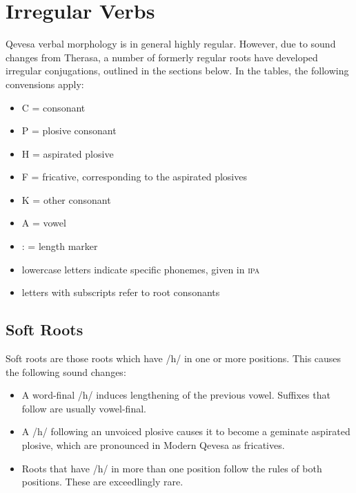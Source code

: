 \documentclass[grammar]{subfiles}
\begin{document}

\newpage
\section{Irregular Verbs}
\label{sec:vm_irregular}

Qevesa verbal morphology is in general highly regular.  However, due to sound
changes from Therasa, a number of formerly regular roots have developed
irregular conjugations, outlined in the sections below.  In the tables, the
following convensions apply: 

\begin{itemize}
  \item C = consonant
  \item P = plosive consonant
  \item H = aspirated plosive
  \item F = fricative, corresponding to the aspirated plosives
  \item K = other consonant
  \item A = vowel
  \item : = length marker
  \item lowercase letters indicate specific phonemes, given in \textsc{ipa}
  \item letters with subscripts refer to root consonants
\end{itemize}


\subsection{Soft Roots}
\label{ssec:vm_soft_roots}

Soft roots are those roots which have /h/ in one or more positions.  This
causes the following sound changes:

\begin{itemize}
  \item A word-final /h/ induces lengthening of the previous vowel.  Suffixes
    that follow are usually vowel-final.
  \item A /h/ following an unvoiced plosive causes it to become a geminate
    aspirated plosive, which are pronounced in Modern Qevesa as fricatives.
  \item Roots that have /h/ in more than one position follow the rules of both
    positions.  These are exceedlingly rare.
\end{itemize}
\end{document}
